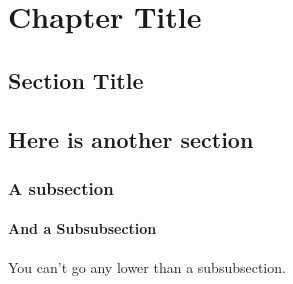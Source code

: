 \chapter{Chapter Title} 


\section{Section Title}



\section{Here is another section}

\subsection{A subsection}

\subsubsection{And a Subsubsection}
You can't go any lower than a subsubsection.



%


